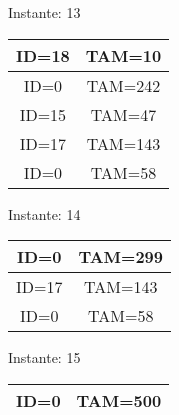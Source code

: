 \documentclass[10pt,a4paper]{article}
\begin{document}
\begin{center}

Instante: 13

\begin{tabular}{|c|c|}
\hline
ID=18 & TAM=10 \\ \hline
ID=0 & TAM=242 \\ \hline
ID=15 & TAM=47 \\ \hline
ID=17 & TAM=143 \\ \hline
ID=0 & TAM=58 \\ \hline
\end{tabular}
\end{center}\pagebreak
\begin{center}

Instante: 14

\begin{tabular}{|c|c|}
\hline
ID=0 & TAM=299 \\ \hline
ID=17 & TAM=143 \\ \hline
ID=0 & TAM=58 \\ \hline
\end{tabular}
\end{center}\pagebreak
\begin{center}

Instante: 15

\begin{tabular}{|c|c|}
\hline
ID=0 & TAM=500 \\ \hline
\end{tabular}
\end{center}\pagebreak
\end{document}
